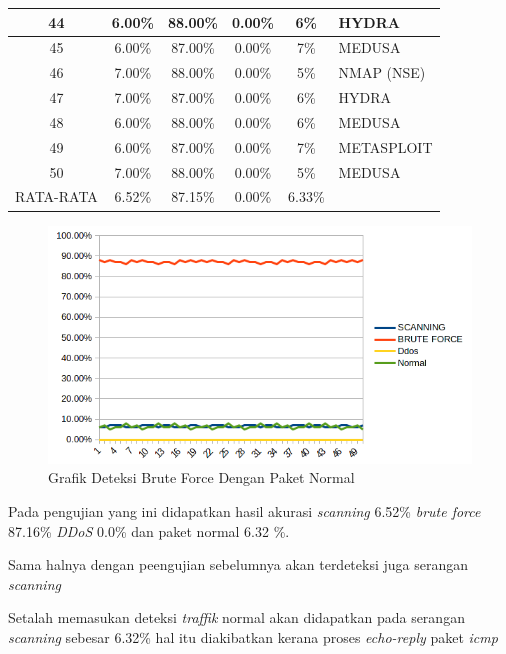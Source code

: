 \begin{table}[H]
\begin{tabular}{|c|c|c|c|c|l|}
		44        & 6.00\%   & 88.00\%     & 0.00\% & 6\%    & HYDRA      \\ \hline
		45        & 6.00\%   & 87.00\%     & 0.00\% & 7\%    & MEDUSA     \\ \hline
		46        & 7.00\%   & 88.00\%     & 0.00\% & 5\%    & NMAP (NSE) \\ \hline
		47        & 7.00\%   & 87.00\%     & 0.00\% & 6\%    & HYDRA      \\ \hline
		48        & 6.00\%   & 88.00\%     & 0.00\% & 6\%    & MEDUSA     \\ \hline
		49        & 6.00\%   & 87.00\%     & 0.00\% & 7\%    & METASPLOIT \\ \hline
		50        & 7.00\%   & 88.00\%     & 0.00\% & 5\%    & MEDUSA     \\ \hline
		RATA-RATA & 6.52\%   & 87.15\%     & 0.00\% & 6.33\% &            \\ \hline
	\end{tabular}
\end{table}


\begin{figure}[H]
	\centering
	\includegraphics[scale=0.9]{gambar/brutenormal}
	\caption{Grafik Deteksi Brute Force Dengan Paket Normal}
	\label{Grafik Deteksi Brute Force Dengan  Paket Normal}
\end{figure}

	
Pada pengujian yang ini didapatkan hasil akurasi \emph{scanning} 6.52\% \emph{brute force} 87.16\% \emph{DDoS} 0.0\% dan paket normal 6.32 \%.

Sama halnya dengan peengujian sebelumnya akan terdeteksi juga serangan \emph{scanning}

Setalah memasukan deteksi \emph{traffik} normal akan didapatkan pada serangan \emph{scanning} sebesar 6.32\% hal itu diakibatkan kerana proses \emph{echo-reply} paket \emph{icmp}



